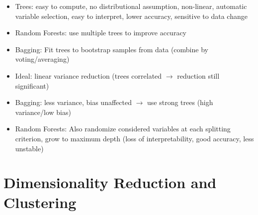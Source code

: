 \documentclass[11pt]{scrartcl}
\begin{document}
\begin{itemize}
    \item Trees: easy to compute, no distributional assumption, non-linear, automatic variable 
        selection, easy to interpret, lower accuracy, sensitive to data change
    \item Random Forests: use multiple trees to improve accuracy 
    \item Bagging: Fit trees to bootstrap samples from data (combine by voting/averaging)
    \item Ideal: linear variance reduction (trees correlated \( \rightarrow \) reduction still 
        significant)
    \item Bagging: less variance, bias unaffected \( \rightarrow \) use strong trees (high 
        variance/low bias)
    \item Random Forests: Also randomize considered variables at each splitting criterion, grow 
        to maximum depth (loss of interpretability, good accuracy, less unstable)
\end{itemize}

\section{Dimensionality Reduction and Clustering}
\end{document}
